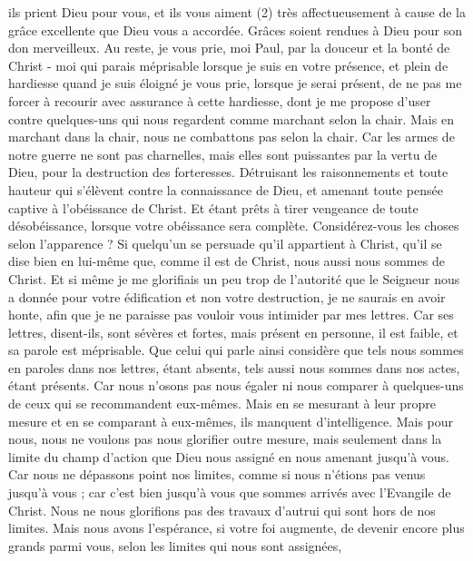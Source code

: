 \begin{multicols}{2}
ils prient Dieu pour vous, et ils vous aiment (2) très affectueusement à cause de la grâce excellente que Dieu vous a accordée.
Grâces soient rendues à Dieu pour son don merveilleux.
\VerseOne{}Au reste, je vous prie, moi Paul, par la douceur et la bonté de Christ - moi qui parais méprisable lorsque je suis en votre présence, et plein de hardiesse quand je suis éloigné
je vous prie, lorsque je serai présent, de ne pas me forcer à recourir avec assurance à cette hardiesse, dont je me propose d’user contre quelques-uns qui nous regardent comme marchant selon la chair.
Mais en marchant dans la chair, nous ne combattons pas selon la chair.
Car les armes de notre guerre ne sont pas charnelles, mais elles sont puissantes par la vertu de Dieu, pour la destruction des forteresses.
Détruisant les raisonnements et toute hauteur qui s'élèvent contre la connaissance de Dieu, et amenant toute pensée captive à l'obéissance de Christ.
Et étant prêts à tirer vengeance de toute désobéissance, lorsque votre obéissance sera complète.
Considérez-vous les choses selon l'apparence ? Si quelqu'un se persuade qu’il appartient à Christ, qu'il se dise bien en lui-même que, comme il est de Christ, nous aussi nous sommes de Christ.
Et si même je me glorifiais un peu trop de l’autorité que le Seigneur nous a donnée pour votre édification et non votre destruction, je ne saurais en avoir honte,
afin que je ne paraisse pas vouloir vous intimider par mes lettres.
Car ses lettres, disent-ils, sont sévères et fortes, mais présent en personne, il est faible, et sa parole est méprisable.
Que celui qui parle ainsi considère que tels nous sommes en paroles dans nos lettres, étant absents, tels aussi nous sommes dans nos actes, étant présents.
Car nous n'osons pas nous égaler ni nous comparer à quelques-uns de ceux qui se recommandent eux-mêmes. Mais en se mesurant à leur propre mesure et en se comparant à eux-mêmes, ils manquent d’intelligence.
Mais pour nous, nous ne voulons pas nous glorifier outre mesure, mais seulement dans la limite du champ d’action que Dieu nous assigné en nous amenant jusqu’à vous.
Car nous ne dépassons point nos limites, comme si nous n'étions pas venus jusqu'à vous ; car c’est bien jusqu’à vous que sommes arrivés avec l'Evangile de Christ.
Nous ne nous glorifions pas des travaux d’autrui qui sont hors de nos limites. Mais nous avons l’espérance, si votre foi augmente, de devenir encore plus grands parmi vous, selon les limites qui nous sont assignées,

\end{multicols}
